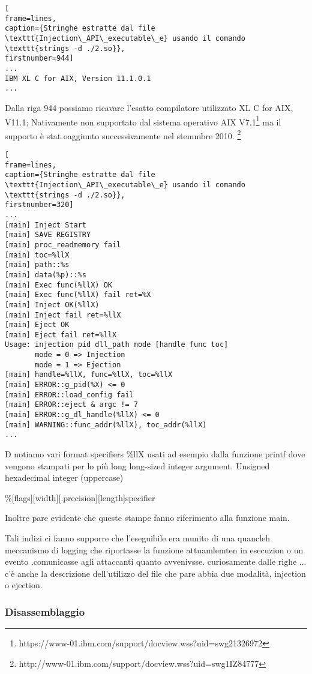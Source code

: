 \documentclass[10pt,a4paper, titlepage]{report}
\begin{document}
\begin{lstlisting}[
frame=lines, 
caption={Stringhe estratte dal file \texttt{Injection\_API\_executable\_e} usando il comando \texttt{strings -d ./2.so}}, 
firstnumber=944]
...
IBM XL C for AIX, Version 11.1.0.1
...
\end{lstlisting}

Dalla riga 944 possiamo ricavare l'esatto compilatore utilizzato XL C for AIX, V11.1; Nativamente non supportato dal sistema operativo AIX V7.1\footnote{https://www-01.ibm.com/support/docview.wss?uid=swg21326972} ma il supporto è stat oaggiunto successivamente nel stemmbre 2010. \footnote{http://www-01.ibm.com/support/docview.wss?uid=swg1IZ84777}

\begin{lstlisting}[
frame=lines, 
caption={Stringhe estratte dal file \texttt{Injection\_API\_executable\_e} usando il comando \texttt{strings -d ./2.so}}, 
firstnumber=320]
...
[main] Inject Start
[main] SAVE REGISTRY
[main] proc_readmemory fail
[main] toc=%llX
[main] path::%s
[main] data(%p)::%s
[main] Exec func(%llX) OK
[main] Exec func(%llX) fail ret=%X
[main] Inject OK(%llX)
[main] Inject fail ret=%llX
[main] Eject OK
[main] Eject fail ret=%llX
Usage: injection pid dll_path mode [handle func toc]
       mode = 0 => Injection
       mode = 1 => Ejection
[main] handle=%llX, func=%llX, toc=%llX
[main] ERROR::g_pid(%X) <= 0
[main] ERROR::load_config fail
[main] ERROR::eject & argc != 7
[main] ERROR::g_dl_handle(%llX) <= 0
[main] WARNING::func_addr(%llX), toc_addr(%llX)
...
\end{lstlisting}

D notiamo vari format specifiers \%llX usati ad esempio dalla funzione printf dove vengono stampati per lo più long long-sized integer argument.
	Unsigned hexadecimal integer (uppercase)
	
\%[flags][width][.precision][length]specifier

Inoltre pare evidente che queste stampe fanno riferimento alla funzione main.

Tali indizi ci fanno supporre che l'eseguibile era munito di una quancleh meccanismo di logging che riportasse la funzione attuamlemten in esecuzion o un evento .comunicasse agli attaccanti quanto avvenivsse. curiosamente dalle righe ... c'è anche la descrizione dell'utilizzo del file che pare abbia due modalità, injection o ejection.

\subsubsection{Disassemblaggio}
\end{document}
